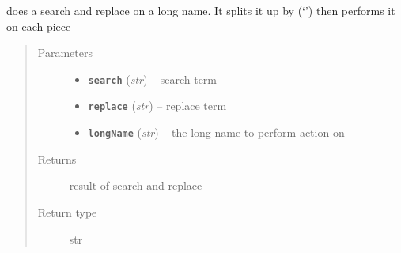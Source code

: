 \documentclass[letterpaper,10pt,english]{sphinxmanual}
\begin{document}

\begin{fulllineitems}
\label{zBuilder.nodes:zBuilder.nodes.zEmbedder.get_embedded_meshes}
\end{fulllineitems}


\begin{fulllineitems}
\label{zBuilder.nodes:zBuilder.nodes.zEmbedder.get_zEmbedder}
\end{fulllineitems}


\begin{fulllineitems}
\label{zBuilder.nodes:zBuilder.nodes.zEmbedder.get_zGeos}
\end{fulllineitems}


\begin{fulllineitems}
\label{zBuilder.nodes:zBuilder.nodes.zEmbedder.replace_longname}
does a search and replace on a long name.  It splits it up by (`\textbar{}') then
performs it on each piece
\begin{quote}\begin{description}
\item[{Parameters}] \leavevmode\begin{itemize}
\item {} 
\textbf{\texttt{search}} (\emph{str}) -- search term

\item {} 
\textbf{\texttt{replace}} (\emph{str}) -- replace term

\item {} 
\textbf{\texttt{longName}} (\emph{str}) -- the long name to perform action on

\end{itemize}

\item[{Returns}] \leavevmode
result of search and replace

\item[{Return type}] \leavevmode
str

\end{description}\end{quote}

\end{fulllineitems}
\end{document}
